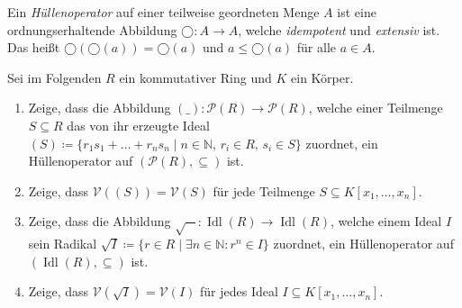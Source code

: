 \documentclass{latex-uebungsblatt/uebungsblatt}
\DeclareMathOperator{\Idl}{Idl}
\begin{document}
\begin{exercise}[Hüllenoperatoren]
  Ein \emph{Hüllenoperator} auf einer teilweise geordneten Menge $A$ ist eine ordnungserhaltende Abbildung $◯:A → A$, welche \emph{idempotent} und \emph{extensiv} ist.
  Das heißt $◯(◯(a))=◯(a)$ und $a ≤ ◯(a)$ für alle $a ∈ A$.

  Sei im Folgenden $R$ ein kommutativer Ring und $K$ ein Körper.
  \begin{enumerate}
    \item Zeige, dass die Abbildung $(\_):𝒫(R) → 𝒫(R)$, welche einer Teilmenge $S⊆R$ das von ihr erzeugte Ideal $(S)\coloneqq \{r_1s_1 + \dots + r_ns_n \mid n ∈ ℕ,\, r_i ∈ R,\, s_i ∈ S\}$ zuordnet, ein Hüllenoperator auf $(𝒫(R),⊆)$ ist.
    \item Zeige, dass $𝒱((S))=𝒱(S)$ für jede Teilmenge $S⊆K[x_1,\dots,x_n]$.
    \item Zeige, dass die Abbildung $\sqrt{-}:\Idl(R) → \Idl(R)$, welche einem Ideal $I$ sein Radikal $\sqrt{I}\coloneqq\{r ∈ R \mid ∃n ∈ ℕ : r^n ∈ I\}$ zuordnet, ein Hüllenoperator auf $(\Idl(R),⊆)$ ist.
    \item Zeige, dass $𝒱(\sqrt{I})=𝒱(I)$ für jedes Ideal $I⊆K[x_1,\dots,x_n]$.
  \end{enumerate}
\end{exercise}
\end{document}
